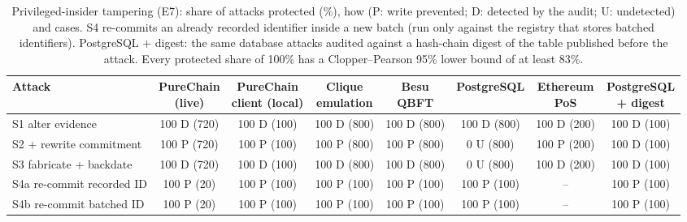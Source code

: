 \begin{table}[t]
\centering
\scriptsize
\caption{Privileged-insider tampering (E7): share of attacks protected (\%), how (P: write prevented; D: detected by the audit; U: undetected) and cases. S4 re-commits an already recorded identifier inside a new batch (run only against the registry that stores batched identifiers). PostgreSQL + digest: the same database attacks audited against a hash-chain digest of the table published before the attack. Every protected share of 100\% has a Clopper--Pearson 95\% lower bound of at least 83\%.}
\label{tab:insider}
\begin{adjustbox}{max width=\textwidth}
\begin{tabular}{lccccccc}
\toprule
Attack & \makecell{PureChain\\(live)} & \makecell{PureChain\\client (local)} & \makecell{Clique\\emulation} & \makecell{Besu\\QBFT} & PostgreSQL & \makecell{Ethereum\\PoS} & \makecell{PostgreSQL\\+ digest} \\
\midrule
S1 alter evidence & 100 D (720) & 100 D (100) & 100 D (800) & 100 D (800) & 100 D (800) & 100 D (200) & 100 D (100) \\
S2 + rewrite commitment & 100 P (720) & 100 P (100) & 100 P (800) & 100 P (800) & 0 U (800) & 100 P (200) & 100 D (100) \\
S3 fabricate + backdate & 100 D (720) & 100 D (100) & 100 D (800) & 100 D (800) & 0 U (800) & 100 D (200) & 100 D (100) \\
S4a re-commit recorded ID & 100 P (20) & 100 P (100) & 100 P (100) & 100 P (100) & 100 P (100) & -- & 100 P (100) \\
S4b re-commit batched ID & 100 P (20) & 100 P (100) & 100 P (100) & 100 P (100) & 100 P (100) & -- & 100 P (100) \\
\bottomrule
\end{tabular}\end{adjustbox}
\end{table}
